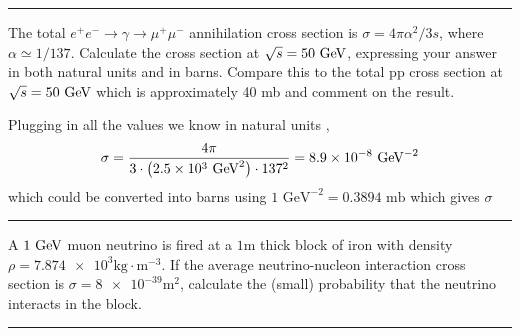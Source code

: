 \noindent\rule{7in}{1.5pt}


\begin{problem}{3.5}
The total $e^+e^-\to\gamma\to\mu^+\mu^-$ annihilation cross section is $\sigma = 4\pi\alpha^2/3s$, where $\alpha \simeq 1/137$. 
Calculate the cross section at $\sqrt{s}=50\text{ GeV}$, expressing your answer in both natural units and in barns.
Compare this to the total pp cross section at $\sqrt{s}=50\text{ GeV}$ which is approximately 40 mb and comment on the result.
\end{problem}
\begin{solution}
Plugging in all the values we know in natural units ,
\begin{align*}
    \sigma = \frac{4\pi}{3\cdot \left( \num{2.5e3} \text{ GeV}^2 \right)\cdot 137^2} = \num{8.9e-8} \text{ GeV}^{-2}
\end{align*}
which could be converted into barns using $1\text{ GeV}^{-2} = 0.3894 \text{ mb}$ which gives $\sigma $
\end{solution} 
    
\noindent\rule{7in}{1.5pt}
    


\begin{problem}{3.6}
A $1\text{ GeV}$ muon neutrino is fired at a $1\unit{\metre}$ thick block of iron with density $\rho=\num{7.874e3}\unit{\kilo\gram\cdot\metre^{-3}}$.
If the average neutrino-nucleon interaction cross section is $\sigma=\num{8e-39}\unit{\square\metre}$, calculate the (small) probability that the neutrino interacts in the block.
\end{problem}
            
\begin{solution}
        
            
\end{solution} 
    
\noindent\rule{7in}{1.5pt}
    



